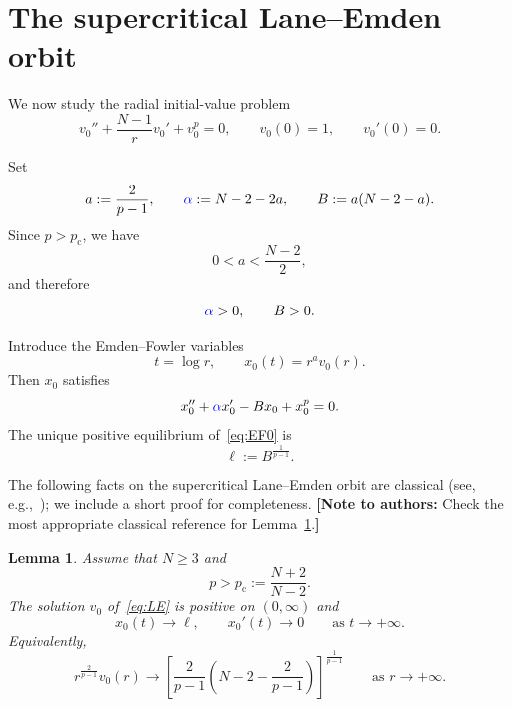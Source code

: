 \documentclass[11pt]{article}
\newcommand{\pc}{p_{\mathrm c}}
\newcommand{\add}[1]{{\color{blue}#1}}
\newcommand{\nota}[1]{{\color{green!50!black}\textbf{[Note to authors:} #1\textbf{]}}}
\newcommand{\oldrev}[1]{#1}
\newcommand{\damp}{\add{\alpha}}            %
\newtheorem{lemma}[theorem]{Lemma}
\theoremstyle{definition}
\begin{document}
  
\section{The supercritical Lane--Emden orbit}

We now study the radial initial-value problem
\begin{equation}
\label{eq:LE}
v_0''
+\frac{N-1}{r}v_0'
+v_0^p
=0,
\qquad
v_0(0)=1,
\qquad
v_0'(0)=0.
\end{equation}

Set
\begin{equation}
\label{eq:aAB}
a:=\frac{2}{p-1},
\qquad
\damp:=N-2-2a,
\qquad
B:=a(N-2-a).
\end{equation}
Since $p>\pc$, we have
\[
0<a<\frac{N-2}{2},
\]
and therefore
\[
\damp>0,
\qquad
B>0.
\]

Introduce the Emden--Fowler variables
\[
t=\log r,
\qquad
x_0(t)=r^a v_0(r).
\]
Then $x_0$ satisfies
\begin{equation}
\label{eq:EF0}
x_0''
+\damp x_0'
-Bx_0
+x_0^p
=0.
\end{equation}
The unique positive equilibrium of~\eqref{eq:EF0} is
\begin{equation}
\label{eq:ell}
\ell
:=
B^{\frac1{p-1}}.
\end{equation}

\add{The following facts on the supercritical Lane--Emden orbit are
classical (see, e.g.,~\cite{JosephLundgren}); we include a short proof
for completeness.}
\nota{Check the most appropriate classical reference for
Lemma~\ref{lem:LEasymptotics}.}

\begin{lemma}
\label{lem:LEasymptotics}
\oldrev{Assume that $N\geq3$ and
\[
p>\pc:=\frac{N+2}{N-2}.
\]}
The solution $v_0$ of~\eqref{eq:LE} is positive on $(0,\infty)$ and
\[
x_0(t)\longrightarrow\ell,
\qquad
x_0'(t)\longrightarrow0
\qquad
\text{as }t\to+\infty.
\]
Equivalently,
\begin{equation}
\label{eq:LE-tail}
r^{\frac2{p-1}}v_0(r)
\longrightarrow
\left[
\frac2{p-1}
\left(
N-2-\frac2{p-1}
\right)
\right]^{\frac1{p-1}}
\qquad
\text{as }r\to+\infty.
\end{equation}
\end{lemma}
\end{document}
